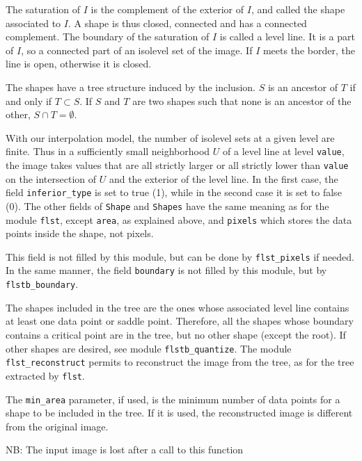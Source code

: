 The saturation of $I$ is the complement of the exterior of $I$, and called the
shape associated to $I$. A shape is thus closed, connected and has a connected
complement. The boundary of the saturation of $I$ is called a level line. It
is a part of $I$, so a connected part of an isolevel set of the image.
If $I$ meets the border, the line is open, otherwise it is closed.

The shapes have a tree structure induced by the inclusion. $S$ is an ancestor
of $T$ if and only if $T\subset S$. If $S$ and $T$ are two shapes such that
none is an ancestor of the other, $S\cap T = \emptyset$.

With our interpolation model, the number of isolevel sets at a given level are
finite. Thus in a sufficiently small neighborhood $U$ of a level line at level
\texttt{value}, the image takes values that are all strictly larger or all
strictly lower than \texttt{value} on the intersection of $U$ and the exterior
of the level line. In the first case, the field \texttt{inferior\_type} is set
to true (1), while in the second case it is set to false (0).
The other fields of \texttt{Shape} and \texttt{Shapes} have the same meaning
as for the module \texttt{flst}, except \texttt{area}, as explained above, and
\texttt{pixels} which stores the data points inside the shape, not pixels.

This field is not filled by this module, but can be done by
\texttt{flst\_pixels} if needed. In the same manner, the field
\texttt{boundary} is not filled by this module, but by
\texttt{flstb\_boundary}.

The shapes included in the tree are the ones whose associated level line
contains at least one data point or saddle point. Therefore, all
the shapes whose boundary contains a critical point are in the tree, but no
other shape (except the root). If other shapes are desired, see module
\texttt{flstb\_quantize}. The module \texttt{flst\_reconstruct} permits to
reconstruct the image from the tree, as for the tree extracted by
\texttt{flst}.

The \texttt{min\_area} parameter, if used, is the minimum number of data points
for a shape to be included in the tree. If it is used, the reconstructed image
is different from the original image.

\bigskip

NB: The input image is lost after a call to this function
